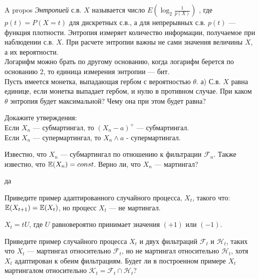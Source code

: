 \begin{solution}
\begin{solution}
\begin{solution}
\begin{solution}
\begin{solution}
\begin{solution}
\begin{solution}
\begin{solution}
\begin{problem}
A propos
{\it Энтропией} с.в.  $X$  называется число $E\left(\log _{2}
\frac{1}{p\left(X\right)} \right)$ , где
$p\left(t\right)=P\left(X=t\right)$  для дискретных с.в., а для
непрерывных с.в.  $p\left(t\right)$  --- функция плотности. Энтропия
измеряет количество информации, получаемое при наблюдении с.в.
$X$. При расчете энтропии важны не сами значения величины $X$, а
их вероятности. \\
Логарифм можно брать по другому основанию, когда логарифм берется
по основанию 2, то единица измерения энтропии --- бит. \\
Пусть имеется монетка, выпадающая гербом с вероятностью  $\theta$.
а) С.в.  $X$  равна единице, если монетка выпадает гербом, и нулю
в противном случае. При каком  $\theta$  энтропия будет
максимальной? Чему она при этом будет равна? 
\end{problem} 
\begin{solution} 

\end{solution}

\begin{problem}
Докажите утверждения: \\
Если $X_{n}$ --- субмартингал, то $(X_{n}-a)^{+}$ --- субмартингал. \\
Если $X_{n}$ --- супермартингал, то $X_{n} \wedge a$ -
супермартингал. 
\end{problem} 
\begin{solution} 

\end{solution}

\begin{problem}
Известно, что $X_{n}$ --- субмартингал по отношению к фильтрации $\mathcal{F}_{n}$. Также известно, что $\mathbb{E}(X_{n})=const$. Верно ли, что $X_{n}$ --- мартингал?
\end{problem} 
\begin{solution} 
да
\end{solution}

\begin{problem}
Приведите пример адаптированного случайного процесса, $X_t$, такого что: $\mathbb{E}(X_{t+1})=\mathbb{E}(X_t)$, но процесс $X_t$ --- не мартингал.
\end{problem} 
\begin{solution} 
$X_t=tU$, где $U$ равновероятно принимает значения $(+1)$ или $(-1)$.  
\end{solution}

\begin{problem}
Приведите пример случайного процесса $X_t$ и двух фильтраций $\mathcal{F}_t$ и $\mathcal{H}_t$, таких что $X_t$ --- мартингал относительно $\mathcal{F}_t$, но не мартингал относительно $\mathcal{H}_t$, хотя $X_t$ адаптирован к обеим фильтрациям. Будет ли в построенном примере $X_t$ мартингалом относительно $\mathcal{K}_t=\mathcal{F}_t \cap \mathcal{H}_t$?


\end{problem}
\end{solution}
\end{solution}
\end{solution}
\end{solution}
\end{solution}
\end{solution}
\end{solution}
\end{solution}
